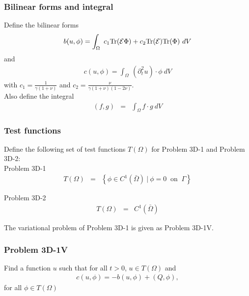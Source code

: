 \documentclass[../../main.tex]{subfiles}
\begin{document}
\subsubsection{Bilinear forms and integral}\label{sssec:3D_Model:BilinearForm}
Define the bilinear forms
\begin{eqnarray}
	b(u,\phi) = \int_\Omega~c_1\textrm{Tr}({\cal E}\Phi)+ c_2\textrm{Tr}({\cal E})
	\textrm{Tr}(\Phi) ~dV \label{eq:3D_Model:Bilinear}
\end{eqnarray}
and
\begin{eqnarray}
	c(u,\phi) = \int_\Omega~ (\partial^2_t u) \cdot \phi~dV \label{eq:3D_Model:Bilinear_c}
\end{eqnarray}
with $\displaystyle c_1 = \frac{1}{\gamma(1+\nu)}$ and $\displaystyle c_2 = \frac{\nu}{\gamma(1+\nu)(1-2\nu)}$.\\

Also define the integral
\begin{eqnarray}
	(f,g) &=& \int_{\Omega} f\cdot g \ dV \label{eq:3D_Model:Bilinear_int}
\end{eqnarray}

\subsubsection{Test functions}\label{sssec:3D_Model:TestFunction}
Define the following set of test functions $T(\Omega)$ for Problem 3D-1 and
Problem 3D-2:\\

Problem 3D-1
\begin{eqnarray*}
	T(\Omega) & = & \left\{ \phi \in C^1(\bar{\Omega}) \ | \ \phi = 0 \ \textrm{ on } \ \Gamma \right\}
\end{eqnarray*}

Problem 3D-2
\begin{eqnarray*}
	T(\Omega) & = &  C^1(\bar{\Omega})
\end{eqnarray*}

The variational problem of Problem 3D-1 is given as Problem 3D-1V.

\subsubsection{Problem 3D-1V}\label{sssec:3D_Model:Problem3D1V}
Find a function $u$ such that for all $t>0$, $u \in T(\Omega)$ and
\begin{align}
	c(u,\phi) = -b(u,\phi) + (Q,\phi), \label{eq:3D_Model:Problem3D1VEq}
\end{align}
for all $\phi \in T(\Omega)$\\
\end{document}
